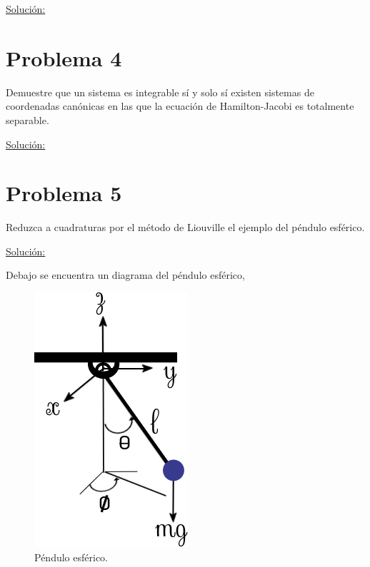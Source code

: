 \documentclass[a4paper,10pt]{article}
\numberwithin{equation}{section}
\begin{document}
\vspace{.3cm}

\underline{Solución:} \vspace{.3cm}

\section{Problema 4}

Demuestre que un sistema es integrable sí y solo sí existen sistemas de coordenadas 
canónicas en las que la ecuación de Hamilton-Jacobi es totalmente separable.

\vspace{.3cm}

\underline{Solución:} \vspace{.3cm}

\section{Problema 5}

Reduzca a cuadraturas por el método de Liouville el ejemplo del péndulo esférico.

\vspace{.3cm}

\underline{Solución:} \vspace{.3cm}

Debajo se encuentra un diagrama del péndulo esférico,

\begin{figure}[H]
 \center 
 \includegraphics[scale=0.6]{problema5fig1}
 \caption{Péndulo esférico.}
 \label{fig:problema5fig1}
\end{figure}
\end{document}
